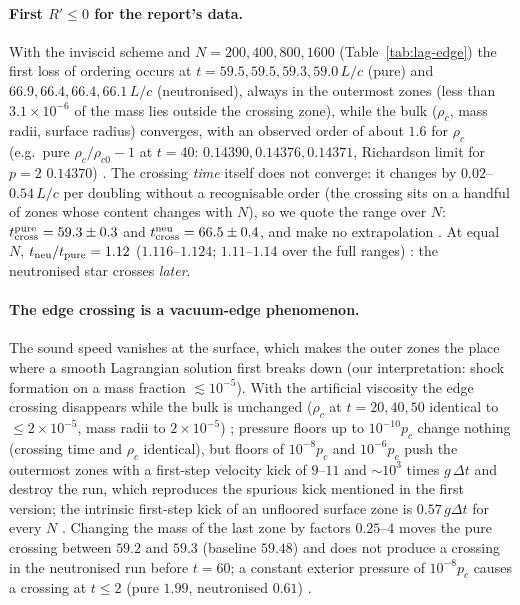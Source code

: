 \documentclass[11pt]{article}
\begin{document}
\paragraph{First $R'\le0$ for the report's data.}  With the inviscid scheme and $N=200,400,800,1600$ (Table~\ref{tab:lag-edge}) the first loss of ordering occurs at $t=59.5,59.5,59.3,59.0\,L/c$ (pure) and $66.9,66.4,66.4,66.1\,L/c$ (neutronised), always in the outermost zones (less than $3.1\times10^{-6}$ of the mass lies outside the crossing zone), while the bulk ($\rho_c$, mass radii, surface radius) converges, with an observed order of about $1.6$ for $\rho_c$ (e.g.\ pure $\rho_c/\rho_{c0}-1$ at $t=40$: $0.14390,0.14376,0.14371$, Richardson limit for $p=2$ $0.14370$) \LP.  The crossing \emph{time} itself does not converge: it changes by $0.02$--$0.54\,L/c$ per doubling without a recognisable order (the crossing sits on a handful of zones whose content changes with $N$), so we quote the range over $N$: $t_{\rm cross}^{\rm pure}=59.3\pm0.3$ and $t_{\rm cross}^{\rm neu}=66.5\pm0.4$, and make no extrapolation \LP.  At equal $N$, $t_{\rm neu}/t_{\rm pure}=1.12$ ($1.116$--$1.124$; $1.11$--$1.14$ over the full ranges) \LP: the neutronised star crosses \emph{later}.

\paragraph{The edge crossing is a vacuum-edge phenomenon.}  The sound speed vanishes at the surface, which makes the outer zones the place where a smooth Lagrangian solution first breaks down (our interpretation: shock formation on a mass fraction $\lesssim10^{-5}$).  With the artificial viscosity the edge crossing disappears while the bulk is unchanged ($\rho_c$ at $t=20,40,50$ identical to $\le2\times10^{-5}$, mass radii to $2\times10^{-5}$) \LP; pressure floors up to $10^{-10}p_c$ change nothing (crossing time and $\rho_c$ identical), but floors of $10^{-8}p_c$ and $10^{-6}p_c$ push the outermost zones with a first-step velocity kick of $9$--$11$ and $\sim10^3$ times $g\,\Delta t$ and destroy the run, which reproduces the spurious kick mentioned in the first version; the intrinsic first-step kick of an unfloored surface zone is $0.57\,g\Delta t$ for every $N$ \LP.  Changing the mass of the last zone by factors $0.25$--$4$ moves the pure crossing between $59.2$ and $59.3$ (baseline $59.48$) and does not produce a crossing in the neutronised run before $t=60$; a constant exterior pressure of $10^{-8}p_c$ causes a crossing at $t\le2$ (pure $1.99$, neutronised $0.61$) \LP.
\end{document}
